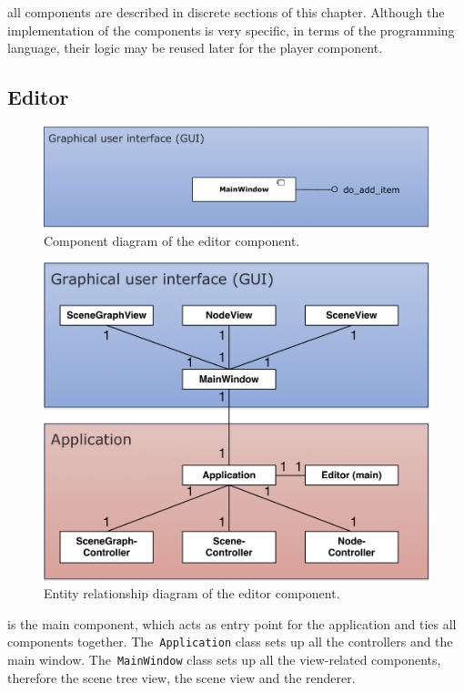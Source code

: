\documentclass[%
    a4paper,    %
    justified,  %
    nobib,      %
    openany     %
]{tufte-book}
\makeatletter
\renewcommand{\label}[1]{\@tufte@label{##1}}%
\makeatother
\begin{document}
 all components are described in discrete
sections of this chapter. Although the implementation of the components is very
specific, in terms of the programming language, their logic may be reused later
for the player component.

\subsection{Editor}
\label{results:subsec:program:editor}

\begin{figure}[ht]
  \caption{Component diagram of the editor component.}
  \label{fig:editor-component-diagram}
  \includegraphics[width=0.95\linewidth]{images/editor-component-diagram}
\end{figure}

\begin{figure}[ht]
  \caption{Entity relationship diagram of the editor component.}
  \label{fig:editor-erd}
  \includegraphics[width=0.75\linewidth]{images/editor-erd}
\end{figure}

 is the main component, which acts as entry
point for the application and ties all components together.
The~\verb=Application= class sets up all the controllers and the main window.
The~\verb=MainWindow= class sets up all the view-related components, therefore
the scene tree view, the scene view and the renderer.
\end{document}

